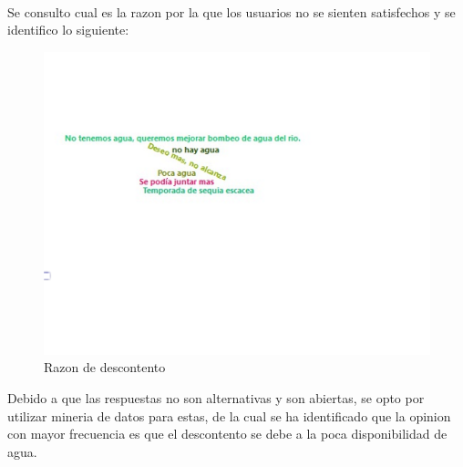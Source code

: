 \documentclass[12pt]{article}\usepackage[]{graphicx}\usepackage[]{xcolor}
\makeatletter
\def\maxwidth{ %
  \ifdim\Gin@nat@width>\linewidth
    \linewidth
  \else
    \Gin@nat@width
  \fi
}
\newenvironment{knitrout}{}{} %
\makeatother
\begin{document}
	\\
	Se consulto cual es la razon por la que los usuarios no se sienten satisfechos y se identifico lo siguiente:
	\begin{figure}[H]
	\centering
\begin{knitrout}
\color{fgcolor}
\includegraphics[width=\maxwidth]{figure/dieciocho-1} 
\end{knitrout}
	\caption{Razon de descontento}
	\end{figure}
	Debido a que las respuestas no son alternativas y son abiertas, se opto por utilizar mineria de datos para estas, de la cual se ha identificado que la opinion con mayor frecuencia es que el descontento se debe a la poca disponibilidad de agua.
\end{document}
